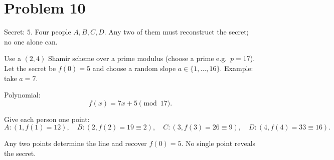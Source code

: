 \section*{Problem 10}

Secret: \(5\). Four people \(A,B,C,D\). Any two of them must reconstruct the secret;
no one alone can.

Use a \((2,4)\) Shamir scheme over a prime modulus (choose a prime e.g.\ \(p=17\)).
Let the secret be \(f(0)=5\) and choose a random slope \(a\in\{1,\ldots,16\}\).  
Example: take \(a=7\).

Polynomial:
\[
f(x)=7x+5 \pmod{17}.
\]

Give each person one point:
\[
A:(1,f(1)=12),\quad B:(2,f(2)=19\equiv 2),\quad
C:(3,f(3)=26\equiv 9),\quad D:(4,f(4)=33\equiv 16).
\]

Any two points determine the line and recover \(f(0)=5\).  
No single point reveals the secret.
